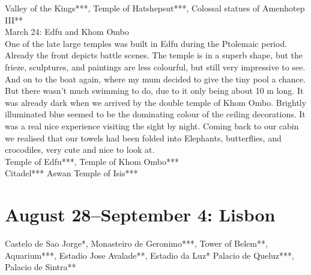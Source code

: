 Valley of the Kings***, Temple of Hatshepsut***, Colossal statues of Amenhotep III**\\

March 24: Edfu and Khom Ombo\\
One of the late large temples was built in Edfu during the Ptolemaic period. Already the front depicts battle scenes. The temple is in a superb shape, but the frieze, sculptures, and paintings are less colourful, but still very impressive to see. And on to the boat again, where my mum decided to give the tiny pool a chance. But there wasn't much swimming to do, due to it only being about 10 m long. It was already dark when we arrived by
 the double temple of Khom Ombo. Brightly illuminated blue seemed to be the dominating colour of the ceiling decorations. It was a real nice experience visiting the sight by night. Coming back to our cabin we realised that our towels had been folded into Elephants, butterflies, and crocodiles, very cute and nice to look at.\\
 
 Temple of Edfu***, Temple of Khom Ombo***\\
 


Citadel***
Aswan Temple of Isis***

\section{August 28--September 4: Lisbon}
\label{2005:lisbon}


Castelo de Sao Jorge*, Monasteiro de Geronimo***, Tower of Belem**, Aquarium***, Estadio Jose Avalade**, Estadio da Luz*
Palacio de Queluz***, Palacio de Sintra**